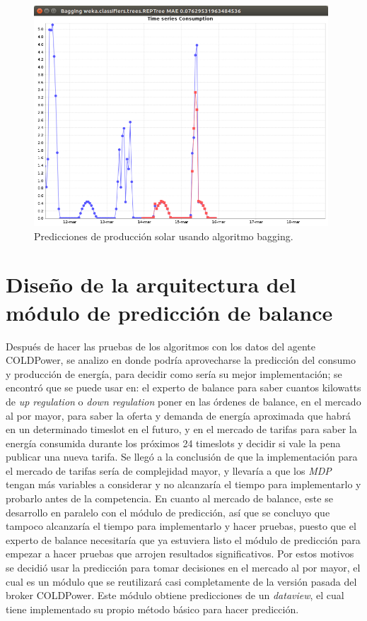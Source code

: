 \begin{figure}[h]
	\centering
	\includegraphics[width=11cm]{img/prediccionSolarBagging.png}
	\caption{Predicciones de producción solar usando algoritmo bagging.}
	\label{fig:prediccionSolarBagging}
\end{figure}

\clearpage
\section{Diseño de la arquitectura del módulo de predicción de balance} \label{sec:disArqu}

Después de hacer las pruebas de los algoritmos con los datos del agente COLDPower, se analizo en donde podría aprovecharse la predicción del consumo y producción de energía, para decidir como sería su mejor implementación; se encontró que se puede usar en: el experto de balance para saber cuantos kilowatts de \textit{up regulation} o \textit{down regulation} poner en las órdenes de balance, %
en el mercado al por mayor, para saber la oferta y demanda de energía aproximada que habrá en un determinado timeslot en el futuro, y en el mercado de tarifas para saber la energía consumida durante los próximos 24 timeslots y decidir si vale la pena publicar una nueva tarifa. 
Se llegó a la conclusión de que la implementación para el mercado de tarifas sería de complejidad mayor, y llevaría a que los \textit{MDP} tengan más variables a considerar y no alcanzaría el tiempo para implementarlo y probarlo antes de la competencia.
En cuanto al mercado de balance, este se desarrollo en paralelo con el módulo de predicción, así que se concluyo que tampoco alcanzaría el tiempo para implementarlo y hacer pruebas, puesto que el experto de balance necesitaría que ya estuviera listo el módulo de  predicción para empezar a hacer pruebas que arrojen resultados significativos.
Por estos motivos se decidió usar la predicción para tomar decisiones en el mercado al por mayor, el cual es un módulo que se reutilizará casi completamente de la versión pasada del broker COLDPower. Este módulo obtiene predicciones de un \textit{dataview}, el cual tiene implementado su propio método básico para hacer predicción.

